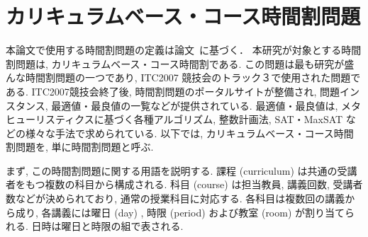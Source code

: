 \chapter{カリキュラムベース・コース時間割問題}




本論文で使用する時間割問題の定義は論文~\cite{%
  anor/Banbara2019,DBLP:journals/anor/BonuttiCGS12}に基づく．
本研究が対象とする時間割問題は, カリキュラムベース・コース時間割である. この問題は最も研究が盛んな時間割問題の一つであり, ITC2007 競技会のトラック３で使用された問題である. ITC2007競技会終了後, 時間割問題のポータルサイトが整備され, 問題インスタンス, 最適値・最良値の一覧などが提供されている. 最適値・最良値は, メタヒューリスティクスに基づく各種アルゴリズム, 整数計画法, SAT・MaxSAT などの様々な手法で求められている. 以下では, カリキュラムベース・コース時間割問題を, 単に時間割問題と呼ぶ.

まず, この時間割問題に関する用語を説明する. 課程 (curriculum) は共通の受講者をもつ複数の科目から構成される. 科目 (course) は担当教員, 講義回数, 受講者数などが決められており, 通常の授業科目に対応する. 各科目は複数回の講義から成り, 各講義には曜日 (day) , 時限 (period) および教室 (room) が割り当てられる. 日時は曜日と時限の組で表される.



